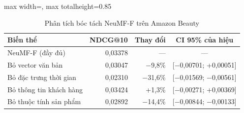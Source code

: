 \begin{table}[H]
    \centering\small
    \caption{Phân tích bóc tách NeuMF-F trên Amazon Beauty}
    \label{tab:amzablation}
    \begin{adjustbox}{max width=\textwidth, max totalheight=0.85\textheight}
    \begin{tabular}{|l|r|r|c|}
        \hline
        Biến thể & NDCG@10 & Thay đổi & CI 95\% của hiệu \\ \hline
        NeuMF-F (đầy đủ) & 0{,}03378 & --- & --- \\ \hline
        Bỏ vector văn bản & 0{,}03047 & $-$9{,}8\% & [$-$0{,}00701; +0{,}00051] \\ \hline
        Bỏ đặc trưng thời gian & 0{,}02310 & $-$31{,}6\% & [$-$0{,}01569; $-$0{,}00561] \\ \hline
        Bỏ thông tin khách hàng & 0{,}03424 & +1{,}3\% & [$-$0{,}00271; +0{,}00369] \\ \hline
        Bỏ thuộc tính sản phẩm & 0{,}02892 & $-$14{,}4\% & [$-$0{,}00844; $-$0{,}00133] \\ \hline
    \end{tabular}
    \end{adjustbox}
\end{table}

